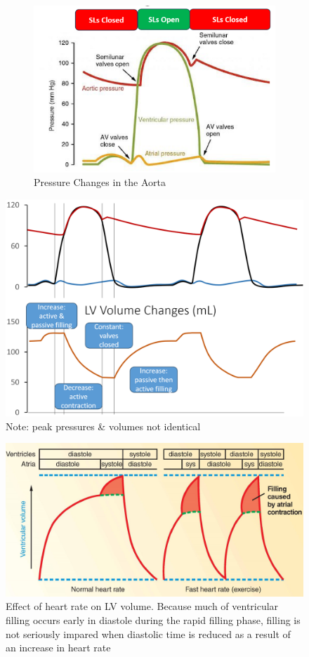 \documentclass[11pt,fleqn]{book} %
\begin{document}
\begin{figure}[h!]
\begin{subfigure}{0.45\textwidth}
        \includegraphics[width=\textwidth]{Pictures/Screenshot 2024-04-04 003437.png}
        \caption{Pressure Changes in the Aorta}
    \end{subfigure}
    \caption{}
\end{figure}

\begin{figure}[h!]
\begin{center}
    \includegraphics[width=0.6\linewidth]{Pictures/Screenshot 2024-04-04 004121.png}
    \caption{Note: peak
pressures \&
volumes not
identical
}
\end{center}
\end{figure}

\begin{figure}[h!]
\begin{center}
    \includegraphics[width=0.6\linewidth]{Pictures/Screenshot 2024-04-04 004240.png}
    \caption{Effect of heart rate on LV volume. Because much of ventricular filling occurs early in diastole during the rapid filling phase, filling is not seriously impared when diastolic time is reduced as a result of an increase in heart rate}
\end{center}
\end{figure}
\end{document}
